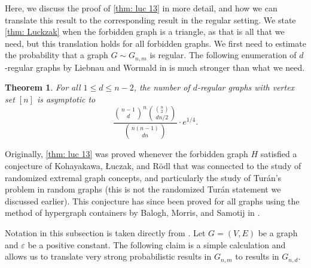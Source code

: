 \documentclass[11pt]{article}
\theoremstyle{plain}
\newtheorem{thm}{Theorem}[section]
\begin{document}
Here, we discuss the proof of \cref{thm: luc 13} in more detail, and how we can translate this result to the corresponding result in the regular setting. We state \cref{thm: Luckzak} when the forbidden graph is a triangle, as that is all that we need, but this translation holds for all forbidden graphs. We first need to estimate the probability that a graph $G \sim G_{n,m}$ is regular. The following enumeration of $d$-regular graphs by Liebnau and Wormald in \cite{LiebenauWormald2024} is much stronger than what we need.
\begin{thm}\label{eq: num d-reg grahs}\cite{LiebenauWormald2024}
    For all $1 \leq d \leq n-2$, the number of $d$-regular graphs with vertex set $[n]$ is asymptotic to
    \[
    \frac{\binom{n-1}{d}^{n}\binom{ \binom{n}{2}}{dn/2}}{\binom{n(n-1)}{dn}}\cdot e^{1/4}.
    \]
\end{thm}

Originally, \cref{thm: luc 13} was proved whenever the forbidden graph $H$ satisfied a conjecture of Kohayakawa, {\L}uczak, and R\"odl that was connected to the study of randomized extremal graph concepts, and particularly the study of Tur\'an's problem in random graphs \cite{kohayakawa1997k} (this is not the randomized Tur\'an statement we discussed earlier). This conjecture has since been proved for all graphs using the method of hypergraph containers by Balogh, Morris, and Samotij in \cite{BaloghMorrisSamotij2015}. 

Notation in this subsection is taken directly from \cite{luczak2000triangle}. Let $G = (V,E)$ be a graph and $\varepsilon$ be a positive constant. 
The following claim is a simple calculation and allows us to translate very strong probabilistic results in $G_{n,m}$ to results in $G_{n,d}$.
\end{document}
